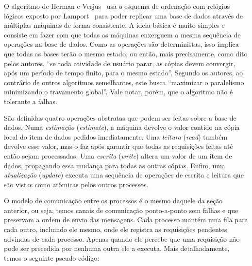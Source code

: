 
O algoritmo de Herman e Verjus~\cite{hermanv79} usa o esquema de
ordenação com relógios lógicos exposto por Lamport~\cite{lamport78}
para poder replicar uma base de dados através de múltiplas máquinas de
forma consistente. A ideia básica é muito simples e consiste em fazer
com que todas as máquinas enxerguem a mesma sequência de operações na
base de dados. Como as operações são deterministas, isso implica que
todas as bases terão o mesmo estado, ou então, mais precisamente, como
dito pelos autores, ``se toda atividade de usuário parar, as cópias
devem convergir, após um período de tempo finito, para o mesmo
estado''. Segundo os autores, ao contrário de outros algoritmos
semelhantes, este busca ``maximizar o paralelismo minimizando o
travamento global''. Vale notar, porém, que o algoritmo não é
tolerante a falhas.

São definidas quatro operações abstratas que podem ser feitas sobre a
base de dados. Numa \emph{estimação} (\emph{estimate}), a máquina
devolve o valor contido na cópia local do item de dados pedidos
imediatamente. Uma \emph{leitura} (\emph{read}) também devolve esse
valor, mas o faz após garantir que todas as requisições feitas até
então sejam processadas. Uma \emph{escrita} (\emph{write}) altera um
valor de um item de dados, propagando essa mudança para todas as
outras cópias. Enfim, uma \emph{atualização} (\emph{update}) executa
uma sequência de operações de escrita e leitura que são vistas como
atômicas pelos outros processos.

O modelo de comunicação entre os processos é o mesmo daquele da seção
anterior, ou seja, temos canais de comunicação ponto-a-ponto sem
falhas e que preservam a ordem de envio das mensagens. Cada processo
mantém uma fila para cada outro, incluindo ele mesmo, onde ele
registra as requisições pendentes advindas de cada processo. Apenas
quando ele percebe que uma requisição não pode ser precedida por
nenhuma outra ele a executa. Mais detalhadamente, temos o seguinte
pseudo-código:

